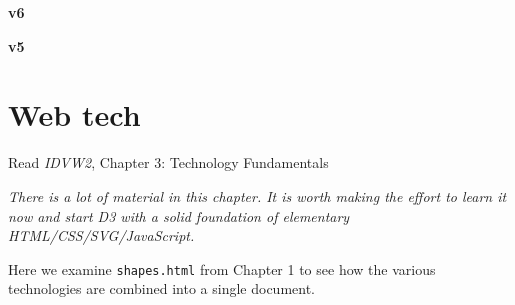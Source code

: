 \documentclass[
  openany]{book}
\newenvironment{Shaded}{\begin{snugshade}}{\end{snugshade}}
\newcommand{\BuiltInTok}[1]{#1}
\newcommand{\FunctionTok}[1]{\textcolor[rgb]{0.00,0.00,0.00}{#1}}
\newcommand{\KeywordTok}[1]{\textcolor[rgb]{0.13,0.29,0.53}{\textbf{#1}}}
\newcommand{\NormalTok}[1]{#1}
\newcommand{\OperatorTok}[1]{\textcolor[rgb]{0.81,0.36,0.00}{\textbf{#1}}}
\newcommand{\SpecialCharTok}[1]{\textcolor[rgb]{0.00,0.00,0.00}{#1}}
\newcommand{\StringTok}[1]{\textcolor[rgb]{0.31,0.60,0.02}{#1}}
\newcommand{\VerbatimStringTok}[1]{\textcolor[rgb]{0.31,0.60,0.02}{#1}}
\begin{document}
\begin{enumerate}
  \textbf{v6}

\begin{Shaded}
\end{Shaded}

  \textbf{v5}

\begin{Shaded}
\end{Shaded}
\end{enumerate}

\hypertarget{web}{%
\chapter{\texorpdfstring{Web tech }{Web tech }}\label{web}}

Read \emph{IDVW2}, Chapter 3: Technology Fundamentals

\emph{There is a lot of material in this chapter. It is worth making the effort to learn it now and start D3 with a solid foundation of elementary HTML/CSS/SVG/JavaScript.}

Here we examine \texttt{shapes.html} from Chapter 1 to see how the various technologies are combined into a single document.
\end{document}
